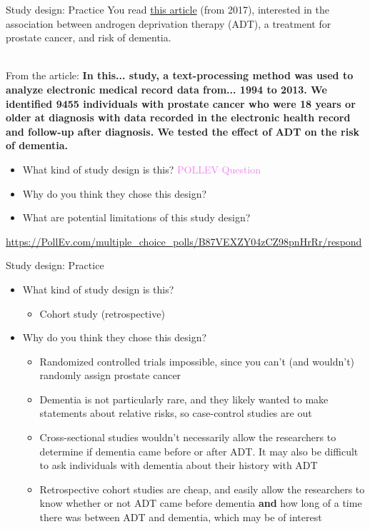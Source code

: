 \documentclass[10pt,t]{beamer}
\begin{document}
\begin{frame}{Study design: Practice}
You read \href{https://jamanetwork.com/journals/jamaoncology/fullarticle/2569059?resultClick=24}{\color{cyan} this article} (from 2017), interested in the association between androgen deprivation therapy (ADT), a treatment for prostate cancer, and risk of dementia. \\~\

From the article: \textbf{In this... study, a text-processing method was used to analyze electronic medical record data from... 1994 to 2013. We identified 9455 individuals with prostate cancer who were 18 years or older at diagnosis with data recorded in the electronic health record and follow-up after diagnosis. We tested the effect of ADT on the risk of dementia.}

\vspace{0.3cm}

\begin{itemize}
	\item What kind of study design is this? \textcolor{violet}{POLLEV Question}
	\item Why do you think they chose this design? %
	\item What are potential limitations of this study design?
\end{itemize}

\footnotesize
\url{https://PollEv.com/multiple_choice_polls/B87VEXZY04zCZ98pnHrRr/respond}
\end{frame}

\begin{frame}{Study design: Practice}
\begin{itemize}
	\item What kind of study design is this?
	\medskip
	\begin{itemize}
		\item[]  \color{blue} Cohort study (retrospective)
	\end{itemize}
\medskip
	\item Why do you think they chose this design? %
		\medskip
	\begin{itemize}
		\item \color{blue} Randomized controlled trials impossible, since you can't (and wouldn't) randomly assign prostate cancer
		\smallskip
		\item \color{blue} Dementia is not particularly rare, and they likely wanted to make statements about relative risks, so case-control studies are out
		\smallskip
		\item  Cross-sectional studies wouldn't necessarily allow the researchers to determine if dementia came before or after ADT. It may also be difficult to ask individuals with dementia about their history with ADT
		\smallskip
		\item Retrospective cohort studies are cheap, and easily allow the researchers to know whether or not ADT came before dementia \textbf{and} how long of a time there was between ADT and dementia, which may be of interest
	\end{itemize}
\end{itemize}
\end{frame}
\end{document}
